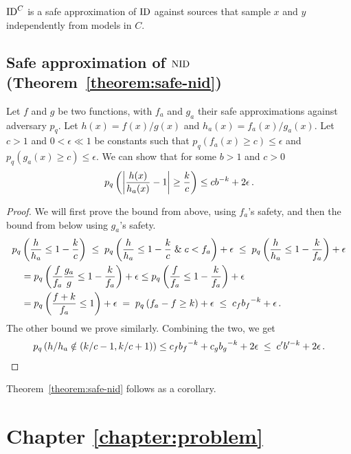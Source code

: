 \begin{corollary}
$\operatorname*{ID}^C$ is a safe approximation of $\operatorname*{ID}$ against sources that sample $x$ and $y$ independently from models in $C$.
\end{corollary}

\subsection{Safe approximation of $\operatorname*{NID}$ (Theorem~\ref{theorem:safe-nid})}

\begin{lemma}
Let $f$ and $g$ be two functions, with $f_a$ and $g_a$ their safe approximations against adversary $p_q$. Let $h(x) = f(x)/g(x)$ and $h_a(x) = f_a(x)/g_a(x)$. Let $c > 1$ and $0 < \epsilon \ll 1$ be constants such that $p_q(f_a(x) \geq c) \leq \epsilon$ and $p_q(g_a(x) \geq c) \leq \epsilon$. We can show that for some $b > 1$ and $c > 0$
\[
p_q\left(\left|\frac{h(x)}{h_a(x)} - 1\right| \geq \frac{k}{c}\right) \leq cb^{-k} + 2\epsilon \,\text{.}
\]
\end{lemma}
\begin{proof}
We will first prove the bound from above, using $f_a$'s safety, and then the bound from below using $g_a$'s safety. 
\begin{align*}
p_q&\left(\frac{h}{h_a} \leq 1 - \frac{k}{c}\right) \;\leq\; p_q\left(\frac{h}{h_a} \leq 1 - \frac{k}{c} \;\&\; c < f_a \right) + \epsilon \;\leq\; p_q\left(\frac{h}{h_a} \leq 1 - \frac{k}{f_a} \right) + \epsilon \\
 &= p_q\left(\frac{f}{f_a}\frac{g_a}{g} \leq 1 - \frac{k}{f_a} \right) + \epsilon \leq p_q\left(\frac{f}{f_a} \leq 1 - \frac{k}{f_a} \right) + \epsilon \\
 &= p_q\left(\frac{f + k}{f_a} \leq 1 \right) + \epsilon \;=\;p_q\left(f_a - f \geq k \right) + \epsilon \;\leq\; c_f{b_f}^{-k} + \epsilon\,\text{.}
\end{align*}
The other bound we prove similarly. Combining the two, we get\belowdisplayskip=-12pt
\begin{align*}
p_q\left(h/h_a \notin \left(k/c - 1, k/c + 1\right)\right) \leq c_f{b_f}^{-k} + c_g{b_g}^{-k} + 2\epsilon \;\leq\; c'b'^{-k} + 2\epsilon \,\text{.}
\end{align*}
\end{proof} 
Theorem~\ref{theorem:safe-nid} follows as a corollary.

\section{Chapter \ref{chapter:problem}}

